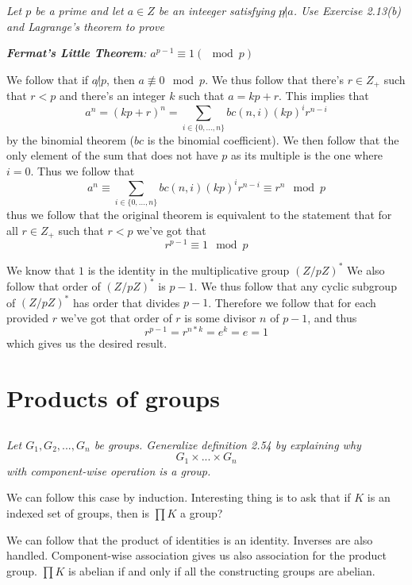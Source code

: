 \documentclass[11pt,oneside,titlepage]{book}
\newcommand{\set}[1]{\{ #1 \}}
\begin{document}
\textit{Let $p$ be a prime and let $a \in Z$ be an inteeger satisfying
  $p \not | a$. Use Exercise 2.13(b) and Lagrange's theorem to prove}

\textit{\textbf{Fermat's Little Theorem}: $a^{p - 1} \equiv 1 (\mod p)$}

We follow that if $a \not | p$, then $a \not \equiv 0 \mod p$. We thus follow that
there's $r \in Z_+$ such that $r < p$ and there's an integer $k$ such that
$a = kp + r$. This implies that
$$a^{n} = (kp + r)^n = \sum_{i \in \set{0, ...,  n}}{bc(n, i)(kp)^{i} r^{n - i}}$$
by the binomial theorem ($bc$ is the binomial coefficient). We then
follow that the only element of the sum that does not have $p$ as its
multiple is the one where $i = 0$. Thus we follow that
$$a^{n} \equiv  \sum_{i \in \set{0, ...,  n}}{bc(n, i)(kp)^{i} r^{n - i}} \equiv r^n \mod p$$
thus we follow that the original theorem is equivalent to the
statement that for all $r \in Z_+$ such that $r < p$ we've got that
$$r^{p - 1} \equiv 1 \mod p$$

We know that $1$ is the identity in the multiplicative group
$(Z/pZ)^*$ We also follow that order of $(Z/pZ)^*$ is $p - 1$. We thus
follow that any cyclic subgroup of $(Z/pZ)^*$ has order that divides
$p - 1$. Therefore we follow that for each provided $r$ we've got that
order of $r$ is some divisor $n$ of $p - 1$, and thus
$$r^{p - 1} = r^{n * k} = e^k = e = 1$$
which gives us the desired result.

\section{Products of groups}

\subsection{}

\textit{Let $G_1, G_2, ..., G_n$ be groups. Generalize definition 2.54
  by explaining why
  $$G_1 \times ... \times G_n$$
  with component-wise operation is a group.}

We can follow this case by induction. Interesting thing is to ask that
if $K$ is an indexed set of groups, then is $\prod{K}$ a group?

We can follow that the product of identities is an identity. Inverses
are also handled.  Component-wise association gives us also
association for the product group. $\prod{K}$ is abelian if and only
if all the constructing groups are abelian.
\end{document}
